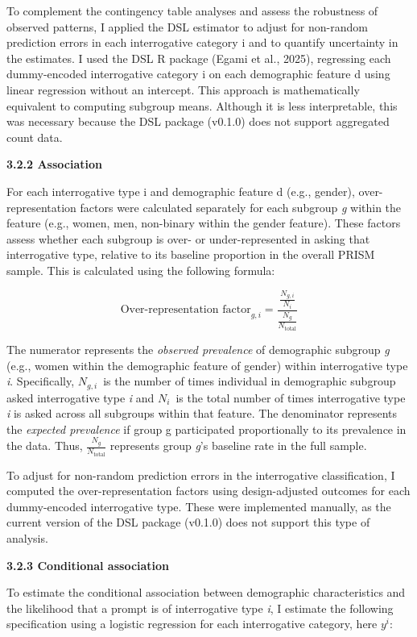 \documentclass[
  12pt,
]{article}
\begin{document}
To complement the contingency table analyses and assess the robustness of observed patterns, I applied the DSL estimator to adjust for non-random prediction errors in each interrogative category i and to quantify uncertainty in the estimates. I used the DSL R package (Egami et al., 2025), regressing each dummy-encoded interrogative category i on each demographic feature d using linear regression without an intercept. This approach is mathematically equivalent to computing subgroup means. Although it is less interpretable, this was necessary because the DSL package (v0.1.0) does not support aggregated count data.

\textbf{3.2.2 Association}

For each interrogative type i and demographic feature d (e.g., gender), over-representation factors were calculated separately for each subgroup \emph{g} within the feature (e.g., women, men, non-binary within the gender feature). These factors assess whether each subgroup is over- or under-represented in asking that interrogative type, relative to its baseline proportion in the overall PRISM sample. This is calculated using the following formula:

\[
\text{Over-representation factor}_{g,i} =
\frac{\frac{N_{g,i}}{N_i}}{\frac{N_g}{N_{\text{total}}}}
\]

The numerator represents the \emph{observed prevalence} of demographic subgroup \emph{g} (e.g., women within the demographic feature of gender) within interrogative type \emph{i}. Specifically, \(N_{g,i}\)~is the number of times individual in demographic subgroup asked interrogative type \emph{i} and \({N_i}\)~is the total number of times interrogative type \emph{i} is asked across all subgroups within that feature. The denominator represents the \emph{expected prevalence} if group g participated proportionally to its prevalence in the data. Thus, \(\frac{N_g}{N_{\text{total}}}\) represents group \emph{g}'s baseline rate in the full sample.

To adjust for non-random prediction errors in the interrogative classification, I computed the over-representation factors using design-adjusted outcomes for each dummy-encoded interrogative type. These were implemented manually, as the current version of the DSL package (v0.1.0) does not support this type of analysis.

\textbf{3.2.3 Conditional association}

To estimate the conditional association between demographic characteristics and the likelihood that a prompt is of interrogative type \emph{i}, I estimate the following specification using a logistic regression for each interrogative category, here \(y^{i}\):
\end{document}

